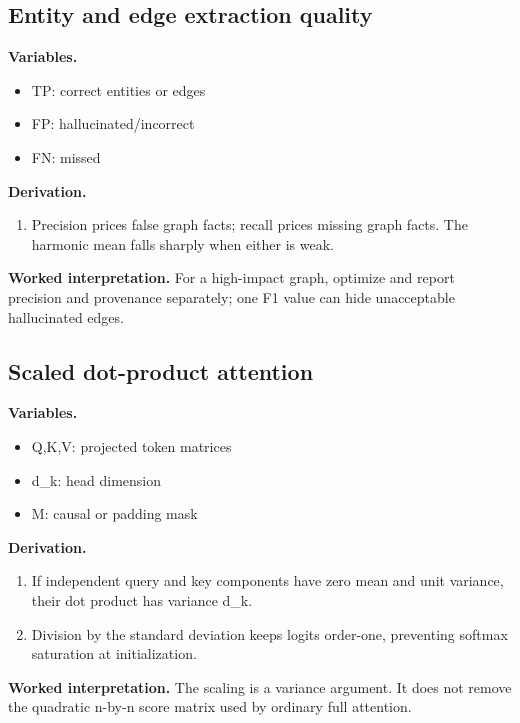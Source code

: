 \subsection{Entity and edge extraction quality}
\textbf{Variables.}\begin{itemize}
\item TP: correct entities or edges
\item FP: hallucinated/incorrect
\item FN: missed
\end{itemize}
\textbf{Derivation.}\begin{derivation}\begin{enumerate}
\item Precision prices false graph facts; recall prices missing graph facts. The harmonic mean falls sharply when either is weak.
\end{enumerate}\end{derivation}
\textbf{Worked interpretation.} For a high-impact graph, optimize and report precision and provenance separately; one F1 value can hide unacceptable hallucinated edges.
\subsection{Scaled dot-product attention}
\textbf{Variables.}\begin{itemize}
\item Q,K,V: projected token matrices
\item d\_k: head dimension
\item M: causal or padding mask
\end{itemize}
\textbf{Derivation.}\begin{derivation}\begin{enumerate}
\item If independent query and key components have zero mean and unit variance, their dot product has variance d\_k.
\item Division by the standard deviation keeps logits order-one, preventing softmax saturation at initialization.
\end{enumerate}\end{derivation}
\textbf{Worked interpretation.} The scaling is a variance argument. It does not remove the quadratic n-by-n score matrix used by ordinary full attention.
